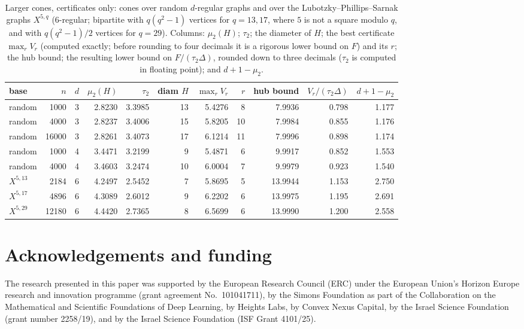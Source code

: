 \documentclass[11pt]{amsart}
\theoremstyle{definition}
\begin{document}
\begin{table}[ht]
\centering
\small
\setlength{\tabcolsep}{4.5pt}
\caption{Larger cones, certificates only: cones over random $d$-regular graphs and over the Lubotzky--Phillips--Sarnak graphs $X^{5,q}$ ($6$-regular; bipartite with $q(q^2-1)$ vertices for $q=13,17$, where $5$ is not a square modulo $q$, and with $q(q^2-1)/2$ vertices for $q=29$). Columns: $\mu_2(H)$; $\tau_2$; the diameter of $H$; the best certificate $\max_rV_r$ (computed exactly; before rounding to four decimals it is a rigorous lower bound on $F$) and its $r$; the hub bound; the resulting lower bound on $F/(\tau_2\Delta)$, rounded down to three decimals ($\tau_2$ is computed in floating point); and $d+1-\mu_2$.}\label{tab:big}
\begin{tabular}{lrrrrrrrrrr}
\toprule
base & $n$ & $d$ & $\mu_2(H)$ & $\tau_2$ & diam $H$ & $\max_rV_r$ & $r$ & hub bound & $V_r/(\tau_2\Delta)$ & $d+1-\mu_2$\\
\midrule
random & 1000 & 3 & 2.8230 & 3.3985 & 13 & 5.4276 & 8 & 7.9936 & 0.798 & 1.177\\
random & 4000 & 3 & 2.8237 & 3.4006 & 15 & 5.8205 & 10 & 7.9984 & 0.855 & 1.176\\
random & 16000 & 3 & 2.8261 & 3.4073 & 17 & 6.1214 & 11 & 7.9996 & 0.898 & 1.174\\
random & 1000 & 4 & 3.4471 & 3.2199 & 9 & 5.4871 & 6 & 9.9917 & 0.852 & 1.553\\
random & 4000 & 4 & 3.4603 & 3.2474 & 10 & 6.0004 & 7 & 9.9979 & 0.923 & 1.540\\
$X^{5,13}$ & 2184 & 6 & 4.2497 & 2.5452 & 7 & 5.8695 & 5 & 13.9944 & 1.153 & 2.750\\
$X^{5,17}$ & 4896 & 6 & 4.3089 & 2.6012 & 9 & 6.2202 & 6 & 13.9975 & 1.195 & 2.691\\
$X^{5,29}$ & 12180 & 6 & 4.4420 & 2.7365 & 8 & 6.5699 & 6 & 13.9990 & 1.200 & 2.558\\
\bottomrule
\end{tabular}
\end{table}

\section*{Acknowledgements and funding}
The research presented in this paper was supported by the European Research
Council (ERC) under the European Union's Horizon Europe research and
innovation programme (grant agreement No.~101041711), by the Simons
Foundation as part of the Collaboration on the Mathematical and Scientific
Foundations of Deep Learning, by Heights Labs, by Convex Nexus Capital, by
the Israel Science Foundation (grant number 2258/19), and by the Israel
Science Foundation (ISF Grant 4101/25).
\end{document}
